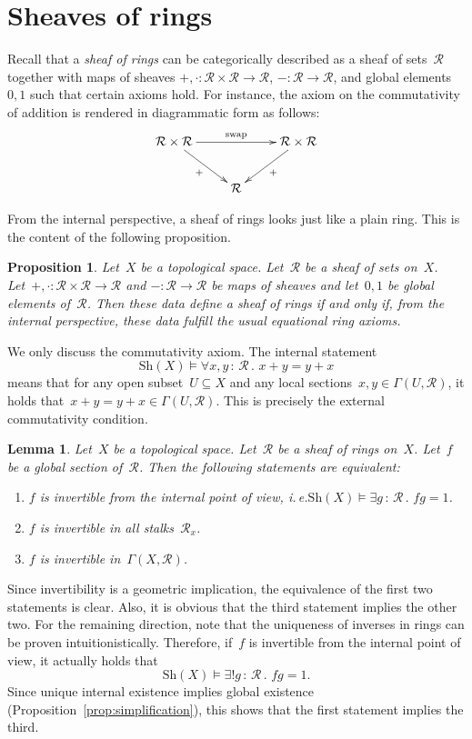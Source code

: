 \documentclass[10pt,reqno,a4paper]{amsbook}
\makeatletter
\theoremstyle{definition}
\theoremstyle{plain}
\newtheorem{prop}[defn]{Proposition}
\newtheorem{lemma}[defn]{Lemma}
\theoremstyle{remark}
\newcommand{\R}{\mathcal{R}}
\newcommand{\Sh}{\mathrm{Sh}}
\newcommand{\?}{\,{:}\,}
\renewcommand{\_}{\mathpunct{.}\,}
\newcommand{\ie}{i.\,e.\@\xspace}
\renewenvironment{proof}[1][\proofname]{\par
  \pushQED{\qed}%
  \normalfont \topsep6\p@\@plus6\p@\relax
  \trivlist
  \item[\hskip\labelsep
        \itshape
    #1\@addpunct{.}]\ignorespaces
}{%
  \popQED\endtrivlist\@endpefalse
}
\makeatother
\begin{document}
\section{Sheaves of rings}
\label{sect:sheaves-of-rings}

Recall that a \emph{sheaf of rings} can be categorically described as a
sheaf of sets~$\R$ together with maps of sheaves $+, \cdot : \R \times \R \to
\R$, $- : \R \to \R$, and global elements~$0, 1$ such that certain axioms hold.
For instance, the axiom on the commutativity of addition is rendered in
diagrammatic form as follows:
\[ \xymatrix{
  \R \times \R \ar[rr]^{\mathrm{swap}} \ar[rd]_{+} && \R \times \R \ar[ld]^{+} \\
  & \R
} \]

From the internal perspective, a sheaf of rings looks just like a plain ring.
This is the content of the following proposition.

\begin{prop}\label{prop:rings-internally}
Let~$X$ be a topological space. Let~$\R$ be a sheaf of sets on~$X$.
Let~$+, \cdot : \R \times \R \to \R$ and $- : \R \to \R$ be maps of sheaves and let~$0, 1$ be
global elements of~$\R$. Then these data define a sheaf of rings if and only
if, from the internal perspective, these data fulfill the usual equational ring
axioms.\end{prop}
\begin{proof}We only discuss the commutativity axiom. The internal statement
\[ \Sh(X) \models \forall x,y\?\R\_ x + y = y + x \]
means that for any open subset~$U \subseteq X$ and any local sections~$x,y \in
\Gamma(U,\R)$, it holds that~$x + y = y + x \in \Gamma(U,\R)$. This is
precisely the external commutativity condition.
\end{proof}

\begin{lemma}\label{lemma:internal-invertibility}
Let~$X$ be a topological space. Let~$\R$ be a sheaf of rings
on~$X$. Let~$f$ be a global section of~$\R$. Then the following statements are
equivalent:
\begin{enumerate}
\item $f$ is invertible from the internal point of view, \ie $\Sh(X) \models
\exists g\?\R\_ fg = 1$.
\item $f$ is invertible in all stalks~$\R_x$.
\item $f$ is invertible in~$\Gamma(X,\R)$.
\end{enumerate}
\end{lemma}
\begin{proof}Since invertibility is a geometric implication, the equivalence of
the first two statements is clear. Also, it is obvious that the third statement
implies the other two. For the remaining direction, note that the
uniqueness of inverses in rings can be proven intuitionistically. Therefore, if~$f$ is invertible
from the internal point of view, it actually holds that
\[ \Sh(X) \models \exists! g\?\R\_ fg = 1. \]
Since unique internal existence implies global existence
(Proposition~\ref{prop:simplification}), this shows that the first statement
implies the third.
\end{proof}
\end{document}
